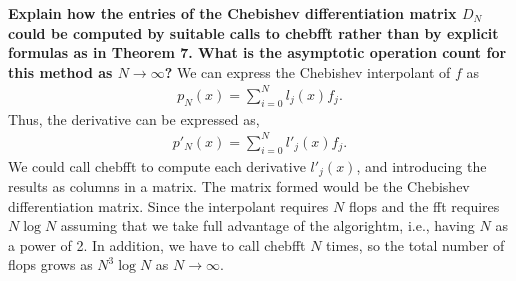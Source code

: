 \textbf{Explain how the entries of the Chebishev differentiation matrix $D_N$ could be computed by suitable calls to chebfft rather than by explicit formulas as in Theorem 7. What is the asymptotic operation count for this method as $N\rightarrow\infty$?}
\newline
We can express the Chebishev interpolant of $f$ as
\begin{align*}
p_N(x) = \sum_{i=0}^Nl_j(x)f_j.
\end{align*}
Thus, the derivative can be expressed as,
\begin{align*}
p'_N(x) = \sum_{i=0}^Nl'_j(x)f_j.
\end{align*}
We could call chebfft to compute each derivative $l'_j(x)$, and introducing the results as columns in a matrix. The matrix formed would be the Chebishev differentiation matrix. Since the interpolant requires $N$ flops and the fft requires $N\log{N}$ assuming that we take full advantage of the algorightm, i.e., having $N$ as a power of 2. In addition, we have to call chebfft $N$ times, so the total number of flops grows as $N^3\log{N}$ as $N\rightarrow\infty$.

